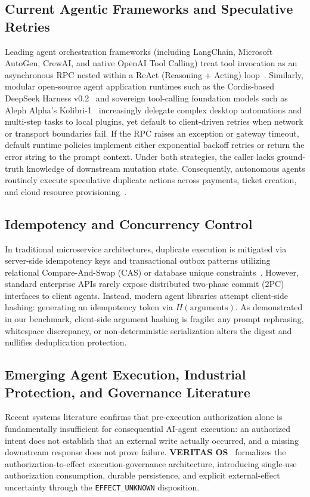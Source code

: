 \documentclass[10pt,journal,compsoc]{IEEEtran}
\begin{document}
\subsection{Current Agentic Frameworks and Speculative Retries}
Leading agent orchestration frameworks (including LangChain, Microsoft AutoGen, CrewAI, and native OpenAI Tool Calling) treat tool invocation as an asynchronous RPC nested within a ReAct (Reasoning + Acting) loop~\cite{react2023, autogen2023}. Similarly, modular open-source agent application runtimes such as the Cordis-based DeepSeek Harness v0.2~\cite{deepseekharness2026} and sovereign tool-calling foundation models such as Aleph Alpha's Kolibri-1~\cite{kolibri2026} increasingly delegate complex desktop automations and multi-step tasks to local plugins, yet default to client-driven retries when network or transport boundaries fail. If the RPC raises an exception or gateway timeout, default runtime policies implement either exponential backoff retries or return the error string to the prompt context. Under both strategies, the caller lacks ground-truth knowledge of downstream mutation state. Consequently, autonomous agents routinely execute speculative duplicate actions across payments, ticket creation, and cloud resource provisioning~\cite{owasp2025}.

\subsection{Idempotency and Concurrency Control}
In traditional microservice architectures, duplicate execution is mitigated via server-side idempotency keys and transactional outbox patterns utilizing relational Compare-And-Swap (CAS) or database unique constraints~\cite{richardson2018}. However, standard enterprise APIs rarely expose distributed two-phase commit (2PC) interfaces to client agents. Instead, modern agent libraries attempt client-side hashing: generating an idempotency token via $H(\text{arguments})$. As demonstrated in our benchmark, client-side argument hashing is fragile: any prompt rephrasing, whitespace discrepancy, or non-deterministic serialization alters the digest and nullifies deduplication protection.

\subsection{Emerging Agent Execution, Industrial Protection, and Governance Literature}
Recent systems literature confirms that pre-execution authorization alone is fundamentally insufficient for consequential AI-agent execution: an authorized intent does not establish that an external write actually occurred, and a missing downstream response does not prove failure.
\textbf{VERITAS OS}~\cite{veritas2026} formalizes the authorization-to-effect execution-governance architecture, introducing single-use authorization consumption, durable persistence, and explicit external-effect uncertainty through the \texttt{EFFECT\_UNKNOWN} disposition.
\end{document}
